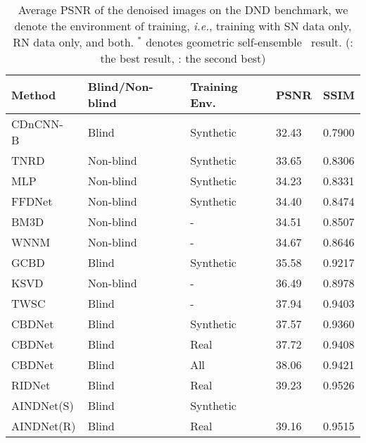 \documentclass[10pt,twocolumn,letterpaper]{article}
\begin{document}
\begin{table}[t]
	\centering
	\caption{Average PSNR of the denoised images on the DND benchmark, we denote the environment of training, {\em i.e.}, training with SN data only, RN data only, and both. $^*$ denotes geometric self-ensemble~\cite{timofte2016seven} result. (\color{red}{red}: \color{black} the best result, \color{blue}{blue}: \color{black} the second best)}
	\label{talbe:DND}
	\begin{adjustbox}{width=0.94\linewidth}
		\begin{tabular}{lllll}
			\toprule			
			Method & Blind/Non-blind   & Training Env.    & PSNR & SSIM  \\
			\midrule
			CDnCNN-B~\cite{zhang2017beyond}         & Blind 	 & Synthetic  & 32.43      & 0.7900      \\
			TNRD~\cite{chen2016trainable}         	 & Non-blind & Synthetic  & 33.65      & 0.8306      \\
			MLP~\cite{burger2012image}         	 & Non-blind & Synthetic  & 34.23  	  & 0.8331      \\
			FFDNet~\cite{zhang2018ffdnet}         	 & Non-blind & Synthetic  & 34.40  	  & 0.8474      \\
			BM3D~\cite{dabov2007color}         	 & Non-blind & -  & 34.51  	  & 0.8507      \\
			WNNM~\cite{gu2014weighted}         	 & Non-blind & -  & 34.67  	  & 0.8646      \\
			GCBD~\cite{chen2018image}         	 & Blind 	 & Synthetic  & 35.58  	  & 0.9217      \\
			KSVD~\cite{aharon2006k}         	 & Non-blind & -  & 36.49  	  & 0.8978      \\
			TWSC~\cite{xu2018trilateral}         	 & Blind 	 & -  & 37.94 	  & 0.9403      \\
			CBDNet~\cite{guo2019toward}    	 & Blind 	 & Synthetic  & 37.57  	  & 0.9360      \\
			CBDNet~\cite{guo2019toward}     & Blind 	 & Real  & 37.72  	  & 0.9408      \\
			CBDNet~\cite{guo2019toward}    	 & Blind 	 & All  & 38.06  	  & 0.9421      \\				
			RIDNet~\cite{Anwar_2019_ICCV}					& Blind		& Real	& 39.23 & 0.9526 \\		
			\midrule
			AINDNet(S) 	    	& Blind 	 & Synthetic  & \color{blue}{39.53}  	  & \color{blue}{0.9561}      \\	
			AINDNet(R) 		& Blind 	 & Real  & 39.16  	  & 0.9515		\\

\end{tabular}
\end{adjustbox}
\end{table}
\end{document}
